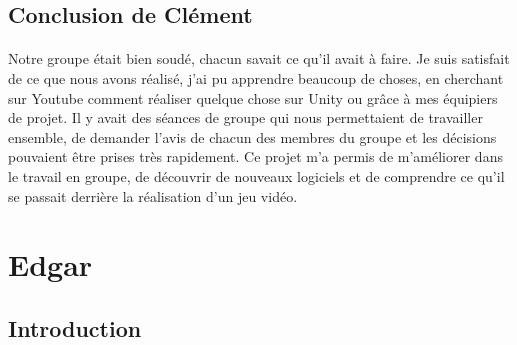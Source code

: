 \documentclass[titlepage, 13px, a4paper]{report}
\begin{document}
\subsection{Conclusion de Clément}
\paragraph*{} \hspace{0pt}
Notre groupe était bien soudé, chacun savait ce qu'il avait à faire. Je suis satisfait 
de ce que nous avons réalisé, j'ai pu apprendre beaucoup de choses, en cherchant sur 
Youtube comment réaliser quelque chose sur Unity ou grâce à mes équipiers de projet. 
Il y avait des séances de groupe qui nous permettaient de travailler ensemble, de demander 
l'avis de chacun des membres du groupe et les décisions pouvaient être prises très rapidement. 
Ce projet m'a permis de m'améliorer dans le travail en groupe, de découvrir de nouveaux 
logiciels et de comprendre ce qu'il se passait derrière la réalisation d'un jeu vidéo.  \

\newpage
\section{Edgar}

\subsection{Introduction}
\end{document}

